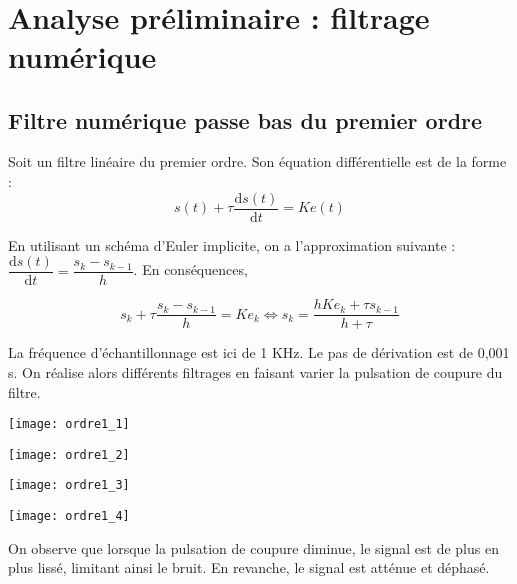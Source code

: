 \exer{[FIC-005]}
\setcounter{numques}{0}~\\


\section*{Analyse préliminaire : filtrage numérique}


\subsection*{Filtre numérique passe bas du premier ordre}
Soit un filtre linéaire du premier ordre. Son équation différentielle est de la forme :
$$
s(t)+\tau \dfrac{\text{d} s(t) }{\text{d}t} = K e(t)
$$

En utilisant un schéma d'Euler implicite, on a l'approximation suivante : $\dfrac{\text{d} s(t) }{\text{d}t} = \dfrac{s_{k}-s_{k-1}}{h}$. En conséquences, 

$$
s_k+\tau \dfrac{s_{k}-s_{k-1}}{h} = K e_k \Leftrightarrow 
s_k = \dfrac{h K e_k+\tau s_{k-1}}{h+\tau}
$$

La fréquence d'échantillonnage est ici de 1 KHz. Le pas de dérivation est de 0,001 s. On réalise alors différents filtrages en faisant varier la pulsation de coupure du filtre. 

\begin{minipage}[c]{.43\linewidth}
\begin{center}
\texttt{[image: ordre1\_1]}
\end{center}
\end{minipage} \hfill
\begin{minipage}[c]{.43\linewidth}
\begin{center}
\texttt{[image: ordre1\_2]}
\end{center}
\end{minipage} 

\begin{minipage}[c]{.43\linewidth}
\begin{center}
\texttt{[image: ordre1\_3]}
\end{center}
\end{minipage} \hfill
\begin{minipage}[c]{.43\linewidth}
\begin{center}
\texttt{[image: ordre1\_4]}
\end{center}
\end{minipage}

On observe que lorsque la pulsation de coupure diminue, le signal est de plus en plus lissé, limitant ainsi le bruit. En revanche, le signal est atténue et déphasé. 




